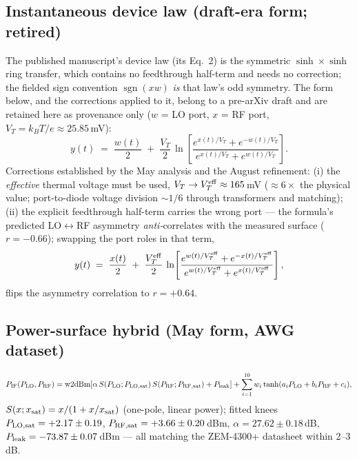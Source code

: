 \documentclass[11pt]{article}
\begin{document}
\subsection*{Instantaneous device law (draft-era form; retired)}
The published manuscript's device law (its Eq.~2) is the symmetric
$\sinh\!\times\!\sinh$ ring transfer, which contains no feedthrough
half-term and needs no correction; the fielded sign convention
$\operatorname{sgn}(xw)$ \emph{is} that law's odd symmetry. The form
below, and the corrections applied to it, belong to a pre-arXiv draft
and are retained here as provenance only ($w$ = LO port, $x$ = RF
port, $V_T = k_BT/e \approx 25.85$\,mV):
\begin{equation}
y(t) \;=\; \frac{w(t)}{2} \;+\; \frac{V_T}{2}\,
\ln\!\left[\frac{e^{x(t)/V_T} + e^{-w(t)/V_T}}
               {e^{x(t)/V_T} + e^{w(t)/V_T}}\right].
\end{equation}
Corrections established by the May analysis and the August
refinement: (i) the \emph{effective} thermal voltage must be used,
$V_T \to V_T^{\rm eff} \approx 165$\,mV ($\approx 6\times$ the
physical value; port-to-diode voltage division $\sim 1/6$ through
transformers and matching); (ii) the explicit feedthrough half-term
carries the wrong port --- the formula's predicted LO$\leftrightarrow$RF
asymmetry \emph{anti-}correlates with the measured surface
($r=-0.66$); swapping the port roles in that term,
\begin{equation}
y(t) \;=\; \frac{x(t)}{2} \;+\; \frac{V_T^{\rm eff}}{2}\,
\ln\!\left[\frac{e^{w(t)/V_T^{\rm eff}} + e^{-x(t)/V_T^{\rm eff}}}
               {e^{w(t)/V_T^{\rm eff}} + e^{x(t)/V_T^{\rm eff}}}\right],
\end{equation}
flips the asymmetry correlation to $r=+0.64$.

\subsection*{Power-surface hybrid (May form, AWG dataset)}
\begin{equation}
P_{\rm IF}(P_{\rm LO},P_{\rm RF}) = \mathrm{w2dBm}\!\left[
\alpha\, S(P_{\rm LO};P_{\rm LO,sat})\, S(P_{\rm RF};P_{\rm RF,sat})
+ P_{\rm leak}\right] + \sum_{i=1}^{10} w_i
\tanh(a_iP_{\rm LO} + b_iP_{\rm RF} + c_i),
\end{equation}
$S(x;x_{\rm sat}) = x/(1+x/x_{\rm sat})$ (one-pole, linear power);
fitted knees $P_{\rm LO,sat}=+2.17\pm0.19$, $P_{\rm RF,sat}=
+3.66\pm0.20$\,dBm, $\alpha = 27.62\pm0.18$\,dB, $P_{\rm leak} =
-73.87\pm0.07$\,dBm --- all matching the ZEM-4300+ datasheet within
2--3\,dB.
\end{document}
